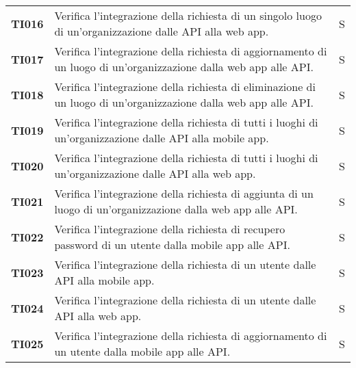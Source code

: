 \documentclass[../../piano-di-qualifica.tex]{subfiles}
\begin{document}
\begin{longtable}[H]{>{\centering\bfseries}m{3cm} >{}m{10cm} >{\centering\arraybackslash}m{3cm}}
  TI016               & Verifica l'integrazione della richiesta di un singolo luogo di un'organizzazione dalle API alla web app.                                      & S                             \\

  TI017               & Verifica l'integrazione della richiesta di aggiornamento di un luogo di un'organizzazione dalla web app alle API\@.                           & S                             \\

  TI018               & Verifica l'integrazione della richiesta di eliminazione di un luogo di un'organizzazione dalla web app alle API\@.                            & S                             \\

  TI019               & Verifica l'integrazione della richiesta di tutti i luoghi di un'organizzazione dalle API alla mobile app.                                     & S                             \\

  TI020               & Verifica l'integrazione della richiesta di tutti i luoghi di un'organizzazione dalle API alla web app.                                        & S                             \\

  TI021               & Verifica l'integrazione della richiesta di aggiunta di un luogo di un'organizzazione dalla web app alle API\@.                                & S                             \\

  TI022               & Verifica l'integrazione della richiesta di recupero password di un utente dalla mobile app alle API\@.                                        & S                             \\

  TI023               & Verifica l'integrazione della richiesta di un utente dalle API alla mobile app.                                                               & S                             \\

  TI024               & Verifica l'integrazione della richiesta di un utente dalle API alla web app.                                                                  & S                             \\

  TI025               & Verifica l'integrazione della richiesta di aggiornamento di un utente dalla mobile app alle API\@.                                            & S                             \\


\end{longtable}
\end{document}
